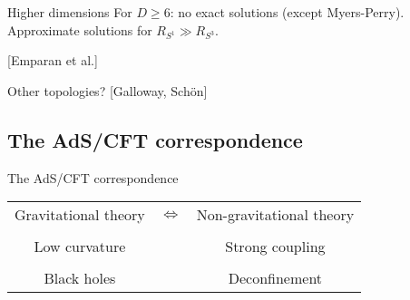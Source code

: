 \documentclass{beamer}
\newcommand{\rref}[1]{\hfill \small{\color{darkgrey} [#1]}}
\newcommand{\rads}{R_\text{AdS}}
\begin{document}

\begin{frame}{Higher dimensions}
%
 For $D \geq 6$: no exact solutions (except Myers-Perry). Approximate solutions for $R_{S^1} \gg R_{S^3}$.

 \begin{center}
   
 \end{center}
 \rref{Emparan et al.}

 Other topologies? \rref{Galloway, Sch\"on}
%
\end{frame}

%
%   
%

\subsection{The AdS/CFT correspondence}

\begin{frame}{The AdS/CFT correspondence}
%
\begin{center}
 \begin{tabular}{ccc}
   Gravitational theory & $\Leftrightarrow$ & Non-gravitational theory \\
   \\
    Low curvature & & Strong coupling \\
    \\
    Black holes & & Deconfinement \\
 \end{tabular}
\end{center}\
%
\end{frame}
\end{document}
